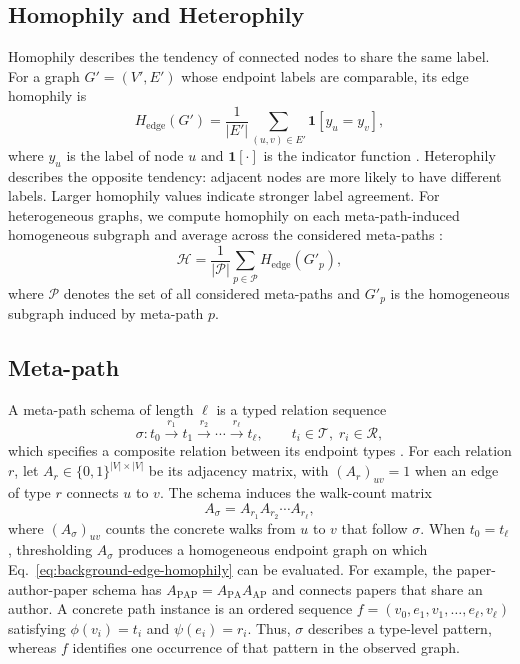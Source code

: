 \documentclass[sigconf,anonymous,review]{acmart}
\begin{document}
\subsection{Homophily and Heterophily}
Homophily describes the tendency of connected nodes to share the same label. For a graph
$G'=(V',E')$ whose endpoint labels are comparable, its edge homophily is
\begin{equation}
  H_{\mathrm{edge}}(G')
  = \frac{1}{|E'|}\sum_{(u,v)\in E'}\mathbf{1}[y_u=y_v],
  \label{eq:background-edge-homophily}
\end{equation}
where $y_u$ is the label of node $u$ and $\mathbf{1}[\cdot]$ is the indicator function
\cite{zhu2020beyond}. Heterophily describes the opposite tendency: adjacent nodes are more likely to have different labels. Larger homophily values indicate stronger label agreement. For heterogeneous graphs, we compute homophily on each meta-path-induced homogeneous subgraph and average across the considered meta-paths \cite{shen2025UHGRL}:
\begin{equation}
    \mathcal{H}
    =
    \frac{1}{|\mathcal{P}|}
    \sum_{p \in \mathcal{P}}
    H_{\mathrm{edge}}(G'_p),
    \label{eq:overall-homophily}
\end{equation}
where $\mathcal{P}$ denotes the set of all considered meta-paths and $G'_p$ is the homogeneous subgraph induced by meta-path $p$.

\subsection{Meta-path}
A meta-path schema of length $\ell$ is a typed relation sequence
\begin{equation}
  \sigma:
  t_0 \xrightarrow{r_1} t_1 \xrightarrow{r_2}\cdots
  \xrightarrow{r_\ell} t_\ell,
  \qquad t_i\in\mathcal{T},\; r_i\in\mathcal{R},
  \label{eq:background-metapath-schema}
\end{equation}
which specifies a composite relation between its endpoint types \cite{sun2011pathsim}. For each
relation $r$, let $A_r\in\{0,1\}^{|V|\times|V|}$ be its adjacency matrix, with
$(A_r)_{uv}=1$ when an edge of type $r$ connects $u$ to $v$. The schema induces the walk-count
matrix
\begin{equation}
  A_\sigma=A_{r_1}A_{r_2}\cdots A_{r_\ell},
  \label{eq:background-metapath-adjacency}
\end{equation}
where $(A_\sigma)_{uv}$ counts the concrete walks from $u$ to $v$ that follow $\sigma$. When
$t_0=t_\ell$, thresholding $A_\sigma$ produces a homogeneous endpoint graph on which
Eq.~\eqref{eq:background-edge-homophily} can be evaluated. For example, the
paper-author-paper schema has $A_{\mathrm{PAP}}=A_{\mathrm{PA}}A_{\mathrm{AP}}$ and connects
papers that share an author. A concrete path instance is an ordered sequence
$f=(v_0,e_1,v_1,\ldots,e_\ell,v_\ell)$ satisfying $\phi(v_i)=t_i$ and $\psi(e_i)=r_i$. Thus,
$\sigma$ describes a type-level pattern, whereas $f$ identifies one occurrence of that pattern in
the observed graph.
\end{document}
